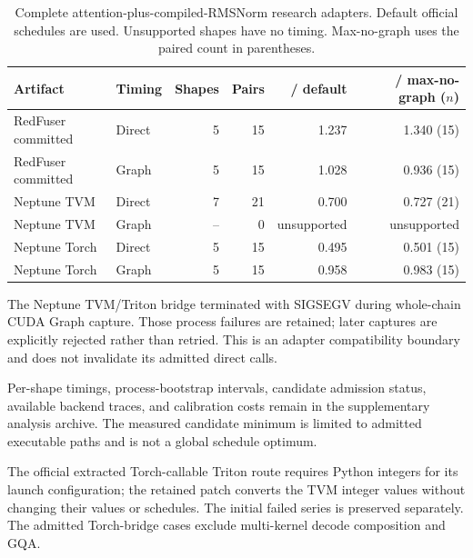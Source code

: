 \begin{table}[t]

\centering\small

\caption{Complete attention-plus-compiled-RMSNorm research adapters. Default official schedules are used. Unsupported shapes have no timing. Max-no-graph uses the paired count in parentheses.}

\label{tab:supplement-research}

\begin{tabular}{@{}llrrrr@{}}

\toprule

Artifact & Timing & Shapes & Pairs & / default & / max-no-graph ($n$) \\

\midrule

RedFuser committed & Direct & 5 & 15 & 1.237 & 1.340 (15) \\

RedFuser committed & Graph & 5 & 15 & 1.028 & 0.936 (15) \\

Neptune TVM & Direct & 7 & 21 & 0.700 & 0.727 (21) \\

Neptune TVM & Graph & -- & 0 & unsupported & unsupported \\

Neptune Torch & Direct & 5 & 15 & 0.495 & 0.501 (15) \\

Neptune Torch & Graph & 5 & 15 & 0.958 & 0.983 (15) \\

\bottomrule

\end{tabular}

\end{table}

The Neptune TVM/Triton bridge terminated with SIGSEGV during whole-chain CUDA Graph capture. Those process failures are retained; later captures are explicitly rejected rather than retried. This is an adapter compatibility boundary and does not invalidate its admitted direct calls.

Per-shape timings, process-bootstrap intervals, candidate admission status, available backend traces, and calibration costs remain in the supplementary analysis archive. The measured candidate minimum is limited to admitted executable paths and is not a global schedule optimum.

The official extracted Torch-callable Triton route requires Python integers for its launch configuration; the retained patch converts the TVM integer values without changing their values or schedules. The initial failed series is preserved separately. The admitted Torch-bridge cases exclude multi-kernel decode composition and GQA.

